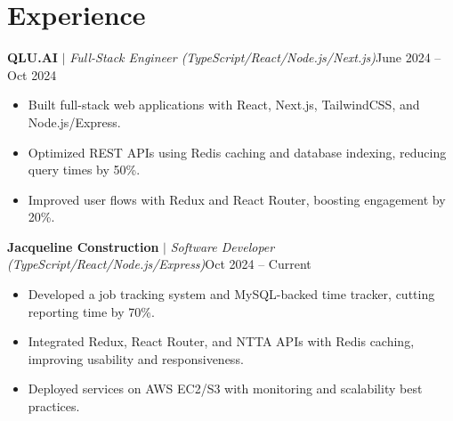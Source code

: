 \section{Experience}
  \resumeSubHeadingListStart

    \resumeProjectHeading
    {\textbf{QLU.AI}\vspace{2pt} $|$ \footnotesize\emph{Full-Stack Engineer (TypeScript/React/Node.js/Next.js)}}{June 2024 -- Oct 2024}
      \begin{itemize}
        \item Built full-stack web applications with React, Next.js, TailwindCSS, and Node.js/Express. 
        \item Optimized REST APIs using Redis caching and database indexing, reducing query times by 50\%.
        \item Improved user flows with Redux and React Router, boosting engagement by 20\%.
      \end{itemize}

    \resumeProjectHeading
    {\textbf{Jacqueline Construction}\vspace{2pt} $|$ \footnotesize\emph{Software Developer (TypeScript/React/Node.js/Express)}}{Oct 2024 -- Current}
      \begin{itemize}
        \item Developed a job tracking system and MySQL-backed time tracker, cutting reporting time by 70\%.
        \item Integrated Redux, React Router, and NTTA APIs with Redis caching, improving usability and responsiveness.
        \item Deployed services on AWS EC2/S3 with monitoring and scalability best practices.
      \end{itemize}

  \resumeSubHeadingListEnd

